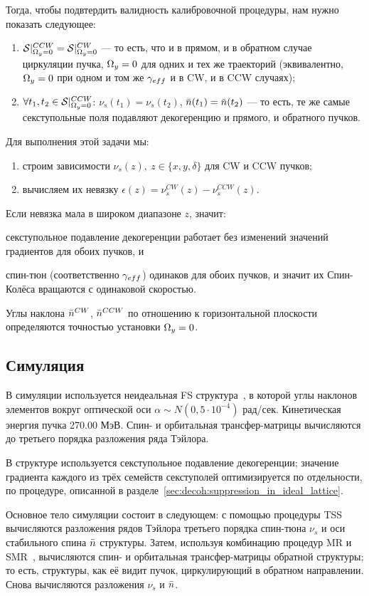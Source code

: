 Тогда, чтобы подвтердить валидность калибровочной процедуры, нам нужно показать следующее:
\begin{enumerate}
\item $\Stab*^{CCW} = \Stab*^{CW}$ --- то есть, что и в прямом, и в обратном случае циркуляции пучка,
  $\Omega_y = 0$ для одних и тех же траекторий (эквивалентно, $\Omega_y=0$ при одном и том же $\g*$ и в CW, и в CCW
  случаях);
\item $\forall t_1,t_2\in\Stab*^{CCW}$: $\nu_s(t_1) = \nu_s(t_2)$, $\bar n(t_1) = \bar n(t_2)$ ---
  то есть, те же самые секступольные поля подавляют декогеренцию и прямого, и обратного пучков.
\end{enumerate}

Для выполнения этой задачи мы:
\begin{enumerate}
\item строим зависимости $\nu_s(z),~z\in\{x,y,\delta\}$ для CW и CCW пучков;
\item вычисляем их невязку $\epsilon(z) = \nu_s^{CW}(z) - \nu_s^{CCW}(z)$.
\end{enumerate}

Если невязка мала в широком диапазоне $z$, значит:
\begin{enumerate*}[1)]
\item секступольное подавление декогеренции работает без изменений значений градиентов для обоих пучков, и
\item спин-тюн (соответственно $\g*$) одинаков для обоих пучков, и значит их Спин-Колёса
вращаются с одинаковой скоростью.
\end{enumerate*}

Углы наклона $\bar n^{CW}$, $\bar n^{CCW}$ по отношению к горизонтальной плоскости определяются точностью установки
$\Omega_y=0$.

\subsection{Симуляция}
В симуляции используется неидеальная FS структура~\cite{Senichev:Lattices}, в которой углы наклонов элементов
вокруг оптической оси $\alpha \sim N(0, 5\cdot10^{-4})$ рад/сек. Кинетическая энергия пучка 270.00 МэВ.
Спин- и орбитальная трансфер-матрицы вычисляются до третьего порядка разложения ряда Тэйлора.

В структуре используется секступольное подавление декогеренции; значение градиента каждого
из трёх семейств секступолей оптимизируется по отдельности, по процедуре, описанной
в разделе~\ref{sec:decoh:suppression_in_ideal_lattice}.

Основное тело симуляции состоит в следующем:
с помощью процедуры TSS~\cite{COSYINF:BeamPhysMan} вычисляются разложения рядов Тэйлора третьего порядка спин-тюна
$\nu_s$ и оси стабильного спина $\bar n$ структуры. Затем, используя комбинацию процедур
MR и SMR~\cite[стр.~233]{Eremey:Thesis}, вычисляются спин- и орбитальная трансфер-матрицы обратной структуры;
то есть, структуры, как её видит пучок, циркулирующий в обратном направлении. Снова вычисляются разложения
$\nu_s$ и $\bar n$.


